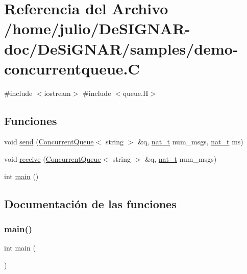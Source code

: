 \hypertarget{demo-concurrentqueue_8_c}{}\section{Referencia del Archivo /home/julio/\+De\+S\+I\+G\+N\+A\+R-\/doc/\+De\+Si\+G\+N\+A\+R/samples/demo-\/concurrentqueue.C}
\label{demo-concurrentqueue_8_c}
{\ttfamily \#include $<$iostream$>$}\newline
{\ttfamily \#include $<$queue.\+H$>$}\newline
\subsection*{Funciones}
\begin{DoxyCompactItemize}
\item 
void \hyperlink{demo-concurrentqueue_8_c_aa97d75998c4e7c6e867a476cb2ac4fba}{send} (\hyperlink{class_designar_1_1_concurrent_queue}{Concurrent\+Queue}$<$ string $>$ \&q, \hyperlink{namespace_designar_aa72662848b9f4815e7bf31a7cf3e33d1}{nat\+\_\+t} num\+\_\+msgs, \hyperlink{namespace_designar_aa72662848b9f4815e7bf31a7cf3e33d1}{nat\+\_\+t} ms)
\item 
void \hyperlink{demo-concurrentqueue_8_c_ab141b5e3494a69e30757648ece395552}{receive} (\hyperlink{class_designar_1_1_concurrent_queue}{Concurrent\+Queue}$<$ string $>$ \&q, \hyperlink{namespace_designar_aa72662848b9f4815e7bf31a7cf3e33d1}{nat\+\_\+t} num\+\_\+msgs)
\item 
int \hyperlink{demo-concurrentqueue_8_c_ae66f6b31b5ad750f1fe042a706a4e3d4}{main} ()
\end{DoxyCompactItemize}


\subsection{Documentación de las funciones}
\mbox{\label{demo-concurrentqueue_8_c_ae66f6b31b5ad750f1fe042a706a4e3d4}} 
\subsubsection{\texorpdfstring{main()}{main()}}
{\footnotesize\ttfamily int main (\begin{DoxyParamCaption}{ }\end{DoxyParamCaption})}



